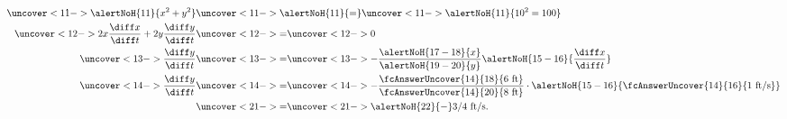 \begin{frame}
\begin{example}
\begin{columns}[c]
\abovedisplayskip=0pt
\belowdisplayskip=0pt
\abovedisplayshortskip=0pt
\belowdisplayshortskip=0pt
\begin{align*}
\uncover<11->{%
\alertNoH{11}{x^2+y^2}%
}%
& \uncover<11->{\alertNoH{ 11}{ = }} %
\uncover<11->{%
\alertNoH{11}{10^2=100}%
}\\%
\uncover<12->{%
2x\frac{\diff x}{\diff t} + 2y\frac{\diff y}{\diff t}%
}%
& \uncover<12->{ = } %
\uncover<12->{%
0%
}\\%
\uncover<13->{%
\frac{\diff y}{\diff t}%
}%
& \uncover<13->{ = } %
\uncover<13->{%
-\frac{\alertNoH{ 17-18}{x}}{\alertNoH{19-20}{y}}\alertNoH{ 15-16}{\frac{\diff x}{\diff t}}%
}\\%
\uncover<14->{%
\frac{\diff y}{\diff t}%
}%
& \uncover<14->{ = } %
\uncover<14->{%
-\frac{\fcAnswerUncover{14}{18}{ 6\text{ ft} }}{\fcAnswerUncover{14}{20}{8\text{ ft}}}\cdot\alertNoH{ 15-16}{\fcAnswerUncover{14}{16}{ 1\text{ ft/s}}}%
}\\%
& \uncover<21->{ = } %
\uncover<21->{%
\alertNoH{22}{-}3/4 \text{ ft/s.}%
}%
\end{align*}
%
\end{columns}
\end{example}
\end{frame}
